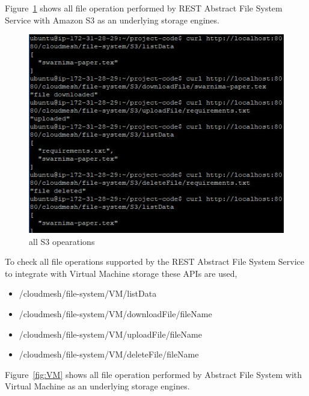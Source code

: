 Figure~\ref{fig:all-s3} shows all file operation performed by REST
Abstract File System Service with Amazon S3 as an underlying storage
engines.

\begin{figure}[!ht]
        \centering\includegraphics[width=\columnwidth]
        {image/all-s3.JPG}
        \caption{all S3 opearations}\label{fig:all-s3}
\end{figure}


To check all file operations supported by the REST Abstract File
System Service to integrate with Virtual Machine storage these APIs
are used,

\begin{itemize}
    \item /cloudmesh/file-system/VM/listData
    \item /cloudmesh/file-system/VM/downloadFile/{fileName}
    \item /cloudmesh/file-system/VM/uploadFile/{fileName}
    \item /cloudmesh/file-system/VM/deleteFile/{fileName}
\end{itemize}

Figure~\ref{fig:VM} shows all file operation performed by Abstract 
File System with Virtual Machine as an underlying storage engines. 

